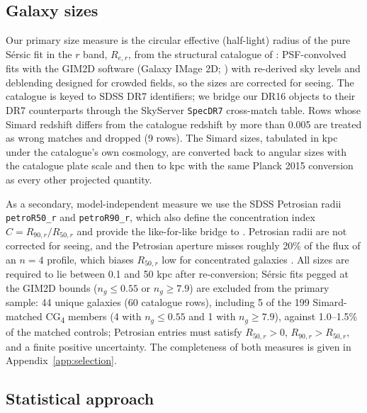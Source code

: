 \documentclass{aa}
\newcommand{\CG}{CG\textsubscript{4}}
\begin{document}
\subsection{Galaxy sizes}\label{sec:size_data}

Our primary size measure is the circular effective (half-light) radius of the pure S\'ersic fit in the $r$ band, \(R_{e,r}\), from the structural catalogue of \citet{Simard2011}: PSF-convolved fits with the GIM2D software (Galaxy IMage 2D; \citealt{Simard+02}) with re-derived sky levels and deblending designed for crowded fields, so the sizes are corrected for seeing. The catalogue is keyed to SDSS DR7 identifiers; we bridge our DR16 objects to their DR7 counterparts through the SkyServer \texttt{SpecDR7} cross-match table. Rows whose Simard redshift differs from the catalogue redshift by more than 0.005 are treated as wrong matches and dropped (9 rows). The Simard sizes, tabulated in kpc under the catalogue's own cosmology, are converted back to angular sizes with the catalogue plate scale and then to kpc with the same Planck 2015 conversion as every other projected quantity.

As a secondary, model-independent measure we use the SDSS Petrosian radii \texttt{petroR50\_r} and \texttt{petroR90\_r}, which also define the concentration index \(C = R_{90,r}/R_{50,r}\) and provide the like-for-like bridge to \citet{Coenda+12}. Petrosian radii are not corrected for seeing, and the Petrosian aperture misses roughly 20\% of the flux of an \(n=4\) profile, which biases \(R_{50,r}\) low for concentrated galaxies \citep{Blanton2001,Graham2005}. All sizes are required to lie between 0.1 and 50 kpc after re-conversion; S\'ersic fits pegged at the GIM2D bounds (\(n_g \le 0.55\) or \(n_g \ge 7.9\)) are excluded from the primary sample: 44 unique galaxies (60 catalogue rows), including 5 of the 199 Simard-matched \CG{} members (4 with \(n_g \le 0.55\) and 1 with \(n_g \ge 7.9\)), against 1.0--1.5\% of the matched controls; Petrosian entries must satisfy \(R_{50,r}>0\), \(R_{90,r}>R_{50,r}\), and a finite positive uncertainty. The completeness of both measures is given in Appendix~\ref{app:selection}.


\subsection{Statistical approach}\label{sec:stats}
\end{document}
